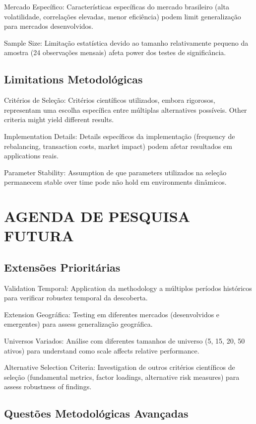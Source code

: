 Mercado Específico: Características específicas do mercado brasileiro (alta volatilidade, correlações elevadas, menor eficiência) podem limit generalização para mercados desenvolvidos.

Sample Size: Limitação estatística devido ao tamanho relativamente pequeno da amostra (24 observações mensais) afeta power dos testes de significância.

\subsection{Limitations Metodológicas}

Critérios de Seleção: Critérios científicos utilizados, embora rigorosos, representam uma escolha específica entre múltiplas alternatives possíveis. Other criteria might yield different results.

Implementation Details: Details específicos da implementação (frequency de rebalancing, transaction costs, market impact) podem afetar resultados em applications reais.

Parameter Stability: Assumption de que parameters utilizados na seleção permanecem stable over time pode não hold em environments dinâmicos.

\section{AGENDA DE PESQUISA FUTURA}

\subsection{Extensões Prioritárias}

Validation Temporal: Application da methodology a múltiplos períodos históricos para verificar robustez temporal da descoberta.

Extension Geográfica: Testing em diferentes mercados (desenvolvidos e emergentes) para assess generalização geográfica.

Universos Variados: Análise com diferentes tamanhos de universo (5, 15, 20, 50 ativos) para understand como scale affects relative performance.

Alternative Selection Criteria: Investigation de outros critérios científicos de seleção (fundamental metrics, factor loadings, alternative risk measures) para assess robustness of findings.

\subsection{Questões Metodológicas Avançadas}

